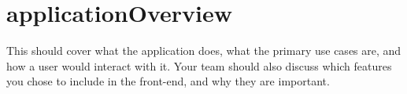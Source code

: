 \section{applicationOverview}
\label{sec:appOver}
This should cover what the application does, what the primary
use cases are, and how a user would interact with it. Your team should also discuss
which features you chose to include in the front-end, and why they are important.


